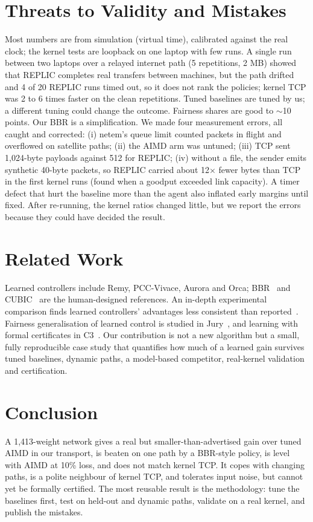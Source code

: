 \documentclass[10pt,twocolumn]{article}
\begin{document}
\section{Threats to Validity and Mistakes}
Most numbers are from simulation (virtual time), calibrated against the real clock; the kernel tests are loopback on one laptop with few runs. A single run between two laptops over a relayed internet path (5 repetitions, 2 MB) showed that REPLIC completes real transfers between machines, but the path drifted and 4 of 20 REPLIC runs timed out, so it does not rank the policies; kernel TCP was 2 to 6 times faster on the clean repetitions. Tuned baselines are tuned by us; a different tuning could change the outcome. Fairness shares are good to $\sim$10 points. Our BBR is a simplification. We made four measurement errors, all caught and corrected: (i) netem's queue limit counted packets in flight and overflowed on satellite paths; (ii) the AIMD arm was untuned; (iii) TCP sent 1,024-byte payloads against 512 for REPLIC; (iv) without a file, the sender emits synthetic 40-byte packets, so REPLIC carried about 12$\times$ fewer bytes than TCP in the first kernel runs (found when a goodput exceeded link capacity). A timer defect that hurt the baseline more than the agent also inflated early margins until fixed. After re-running, the kernel ratios changed little, but we report the errors because they could have decided the result.

\section{Related Work}
Learned controllers include Remy, PCC-Vivace, Aurora and Orca; BBR~\cite{bbr} and CUBIC~\cite{cubic} are the human-designed references. An in-depth experimental comparison finds learned controllers' advantages less consistent than reported~\cite{mazilu}. Fairness generalisation of learned control is studied in Jury~\cite{jury}, and learning with formal certificates in C3~\cite{c3}. Our contribution is not a new algorithm but a small, fully reproducible case study that quantifies how much of a learned gain survives tuned baselines, dynamic paths, a model-based competitor, real-kernel validation and certification.

\section{Conclusion}
A 1,413-weight network gives a real but smaller-than-advertised gain over tuned AIMD in our transport, is beaten on one path by a BBR-style policy, is level with AIMD at 10\% loss, and does not match kernel TCP. It copes with changing paths, is a polite neighbour of kernel TCP, and tolerates input noise, but cannot yet be formally certified. The most reusable result is the methodology: tune the baselines first, test on held-out and dynamic paths, validate on a real kernel, and publish the mistakes.
\end{document}
